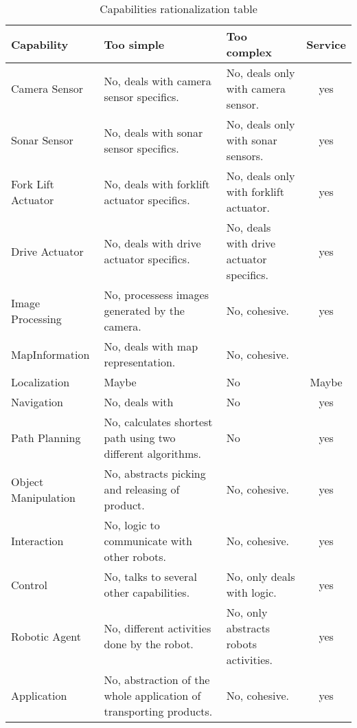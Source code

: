 \begin{table}[ht]
	\centering
	\begin{tabular}{| l | p{3.2cm} | p{3.2cm} | c |}
		\hline
		Capability & Too simple & Too complex & Service\\
		\hline
		Camera Sensor 		& No, deals with camera sensor specifics. & No, deals only with camera sensor. & yes\\
		\hline
		Sonar Sensor 		& No, deals with sonar sensor specifics. & No, deals only with sonar sensors. & yes\\
		\hline
		Fork Lift Actuator 	& No, deals with forklift actuator specifics. & No, deals only with forklift actuator. & yes\\
		\hline
		Drive Actuator 		& No, deals with drive actuator specifics. & No, deals with drive actuator specifics. & yes\\
		\hline
		Image Processing 	& No, processess images generated by the camera. & No, cohesive. & yes\\
		\hline
		MapInformation		& No, deals with map representation. & No, cohesive. &\\
		\hline
		Localization 		& Maybe & No & Maybe\\ %
		\hline
		Navigation 			& No, deals with & No & yes\\
		\hline
		Path Planning 		& No, calculates shortest path using two different algorithms. & No & yes\\
		\hline
		Object Manipulation & No, abstracts picking and releasing of product. & No, cohesive. & yes\\
		\hline
		Interaction 		& No, logic to communicate with other robots. & No, cohesive. & yes\\
		\hline
		Control 			& No, talks to several other capabilities. & No, only deals with logic. & yes\\
		\hline
		Robotic Agent 		& No, different activities done by the robot. & No, only abstracts robots activities. & yes\\
		\hline
		Application 		& No, abstraction of the whole application of transporting products. & No, cohesive. & yes\\
		\hline
	\end{tabular}
	\caption{Capabilities rationalization table}
\end{table}
